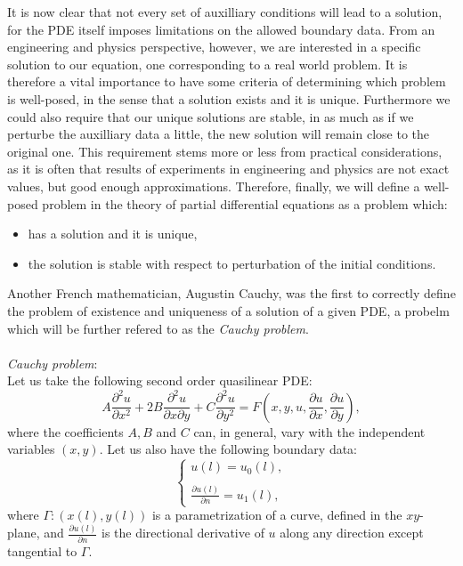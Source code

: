 It is now clear that not every set of auxilliary conditions will lead to a solution, for the PDE itself imposes limitations on the allowed boundary data. From an engineering and physics perspective, however, 
we are interested in a specific solution to our equation, one corresponding to a real world problem. It is therefore a vital importance to have some criteria of determining which problem is well-posed, in the sense that a solution exists and it is unique. Furthermore we could also require that our unique solutions are stable, in as much as if we perturbe the auxilliary data a little, the new solution will remain close to the original one. This requirement stems more or less from practical considerations, as it is often that results of experiments in engineering and physics are not exact values, but good enough approximations. Therefore, finally, we will define a well-posed problem in the theory of partial differential equations as a problem which:
\begin{itemize}
  \item has a solution and it is unique,
  \item the solution is stable with respect to perturbation of the initial conditions.  
\end{itemize}

Another French mathematician, Augustin Cauchy, was the first to correctly define the problem of existence and uniqueness of a solution of a given PDE, a probelm which will be further refered to as the \textit{Cauchy problem}. \\\\
\emph{Cauchy problem}:\\
Let us take the following second order quasilinear PDE:
\begin{equation}
  \label{eq:quasilinearpde}
  A \frac{\partial ^2 u}{\partial x^2} +2B \frac{\partial ^2 u}{\partial x \partial y} +  C \frac{\partial ^2 u}{\partial y^2} = F(x,y,u,\frac{\partial u}{\partial x},\frac{\partial u}{\partial y}), 
\end{equation}
where the coefficients $A,B$ and $C$ can, in general, vary with the independent variables $(x,y)$. Let us also have the following boundary data:
\begin{equation}
  \label{eq:cauchydata}
  \begin{cases}
  u(l)  = u_0(l), \\ 
  \\
  \frac{\partial u(l)}{\partial n} = u_1(l) ,
\end{cases}
\end{equation}
where $\Gamma : (x(l),y(l)) $ is a parametrization of a curve, defined in the $xy$-plane, and $ \frac{\partial u(l)}{\partial n} $ is the directional derivative of $u$ along any direction except tangential to $\Gamma$.

